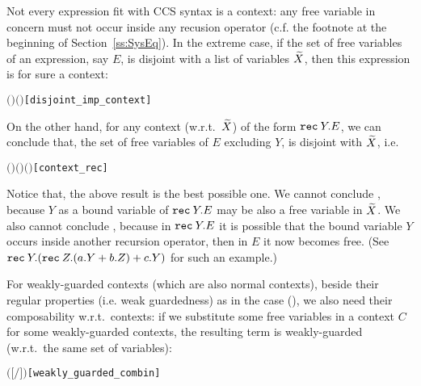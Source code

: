 Not every expression fit with CCS syntax is a context: any free
variable in concern must not occur inside any recusion operator
(c.f. the footnote at the beginning of Section~\ref{ss:SysEq}). In the
extreme case, if the set of free variables of an expression, say $E$,
is disjoint with a list of variables $\widetilde X$, then this expression is
for sure a context:
\begin{alltt}
\HOLTokenTurnstile{}  \ensuremath{(} \ensuremath{)} \ensuremath{(} \ensuremath{)} \HOLSymConst{\HOLTokenImp{}}   \hfill{[disjoint_imp_context]}
\end{alltt}
On the other hand, for any context (w.r.t.~$\widetilde X$) of the form ${\tt rec}\: Y . E$, we can
conclude that, the set of free variables of $E$ excluding $Y$, is
disjoint with $\widetilde X$, i.e.
\begin{alltt}
\HOLTokenTurnstile{}   \ensuremath{(}  \ensuremath{)} \HOLSymConst{\HOLTokenImp{}}  \ensuremath{(}   \ensuremath{)} \ensuremath{(} \ensuremath{)}\hfill{[context_rec]}
\end{alltt}
Notice that, the above result is the best possible one. We cannot
conclude , because $Y$ as a bound
variable of ${\tt rec}\: Y . E$ may be also a free variable in $\widetilde X$. We
also cannot conclude , because in ${\tt rec}\: Y . E$
it is possible that the bound variable $Y$ occurs inside another
recursion operator, then in $E$ it now becomes free. (See ${\tt rec}\: Y . ({\tt rec}\: Z . (a.Y + b.Z) + c.Y)$ for such an example.)

For weakly-guarded contexts (which are also normal contexts), beside
their regular properties (i.e. weak
guardedness) as in the \univariate case (), we also need
their composability w.r.t.~\multivariate contexts: if we
substitute some free variables in a context $C$ for some weakly-guarded
contexts, the resulting term is weakly-guarded (w.r.t.~the same set of variables):
\begin{alltt}
\HOLTokenTurnstile{}   \HOLSymConst{\HOLTokenConj{}}    \HOLSymConst{\HOLTokenConj{}}    \HOLSymConst{\HOLTokenConj{}}
     \HOLSymConst{\ensuremath{=}}   \HOLSymConst{\HOLTokenImp{}}
     \ensuremath{(}\ensuremath{[}\ensuremath{/}\ensuremath{]} \ensuremath{)}\hfill{[weakly_guarded_combin]}
\end{alltt}

